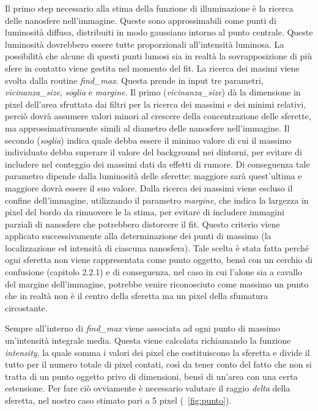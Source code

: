 Il primo step necessario alla stima della funzione di illuminazione è la ricerca delle nanosfere nell'immagine.
Queste sono approssimabili come punti di luminosità diffusa, distribuiti in modo gaussiano intorno al punto centrale.
Queste luminosità dovrebbero essere tutte proporzionali all'intensità luminosa.
La possibilità che alcune di questi punti lumosi sia in realtà la sovrapposizione di più sfere in contatto viene gestita nel momento del fit.
La ricerca dei masimi viene svolta dalla routine \textit{find\_max}.
Questa prende in input tre parametri, \textit{vicinanza\_size}, \textit{soglia} e \textit{margine}.
Il primo (\textit{vicinanza\_size}) dà la dimensione in pixel dell'area sfruttata dai filtri per la ricerca dei massimi e dei minimi relativi, perciò dovrà assumere valori minori al crescere della concentrazione delle sferette, ma approssimativamente simili al diametro delle nanosfere nell'immagine. 
Il secondo (\textit{soglia}) indica quale debba essere il minimo valore di cui il massimo individuato debba superare il valore del background nei dintorni, per evitare di includere nel conteggio dei massimi dati da effetti di rumore.
Di conseguenza tale parametro dipende dalla luminosità delle sferette: maggiore sarà quest'ultima e maggiore dovrà essere il suo valore.
Dalla ricerca dei massimi viene escluso il confine dell'immagine, utilizzando il parametro \textit{margine}, che indica la largezza in pixel del bordo da rimuovere le la stima, per evitare di includere immagini parziali di nanosfere che potrebbero distorcere il fit.
Questo criterio viene applicato successivamente alla determinazione dei punti di massimo (la localizzazione ed intensità di ciascuna nanosfera).
Tale scelta è stata fatta perché ogni sferetta non viene rappresentata come punto oggetto, bensì con un cerchio di confusione (capitolo 2.2.1) e di conseguenza, nel caso in cui l'alone sia a cavallo del margine dell'immagine, potrebbe venire riconosciuto come massimo un punto che in realtà non è il centro della sferetta ma un pixel della sfumatura circostante.

Sempre all'interno di \textit{find\_max} viene associata ad ogni punto di massimo un'intensità integrale media. 
Questa viene calcolata richiamando la funzione \textit{intensity}, la quale somma i valori dei pixel che costituiscono la sferetta e divide il tutto per il numero totale di pixel contati, così da tener conto del fatto che non si tratta di un punto oggetto privo di dimensioni, bensì di un'area con una certa estensione. 
Per fare ciò ovviamente è necessario valutare il raggio \textit{delta} della sferetta, nel nostro caso stimato pari a 5 pixel (\figurename~\ref{fig:punto}).


